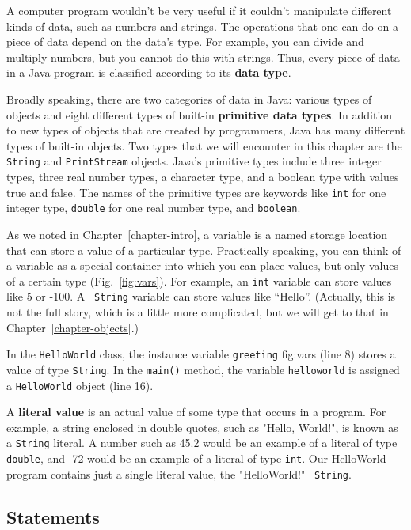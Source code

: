\noindent A computer program wouldn't be very useful if it couldn't
manipulate different kinds of data, such as numbers and strings.  The
operations that one can do on a piece of data depend on the data's
type. For example, you can divide and multiply numbers, but you cannot
do this with strings.  Thus, every piece of data in a Java program is
classified according to its {\bf data type}.

Broadly speaking, there are two categories of data in Java: various
types of objects and eight different types of built-in {\bf primitive
data types}.  In addition to new types of objects that are created by
programmers, Java has many different types of built-in objects. Two
types that we will encounter in this chapter are the {\tt String} and
{\tt PrintStream} objects. Java's primitive types include three
integer types, three real number types, a character type, and a
boolean type with values true and false.  The names of the primitive
types are keywords like {\tt int} for one integer type, {\tt double}
for one real number type, and {\tt boolean}.

As we noted in Chapter~\ref{chapter-intro}, a variable is a named storage location that
can store a value of a particular type. Practically speaking, you can
think of a variable as a special container into which you can place
values, but only values of a certain type (Fig.~\ref{fig:vars}). For
example, an {\tt int} variable can store values like 5 or -100. A {\tt
String} variable can store values like ``Hello''.  (Actually, this is
not the full story, which is a little more complicated, but we will
get to that in Chapter~\ref{chapter-objects}.)

In the {\tt HelloWorld} class, the instance variable {\tt greeting}
{fig:vars}
(line 8) stores a value of type {\tt String}. In the {\tt main()}
method, the variable {\tt helloworld} is assigned 
a {\tt HelloWorld} object (line 16).

A {\bf literal value} is an actual value of some type that occurs in a
program. For example, a string enclosed in double quotes, such as
"Hello, World!", is known as a {\tt String} literal. A number such as
45.2 would be an example of a literal of type {\tt double}, and -72
would be an example of a literal of type {\tt int}.  Our HelloWorld
program contains just a single literal value, the "HelloWorld!" {\tt
String}.

\subsection{Statements}
\label{subsec:statements}

